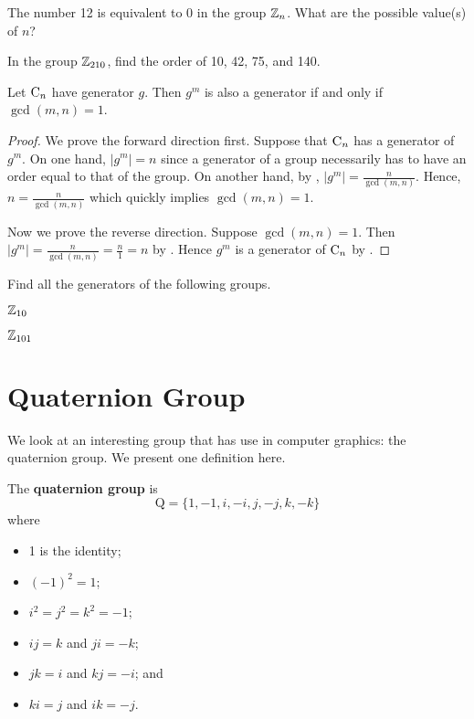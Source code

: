 \begin{exercise}
    The number 12 is equivalent to 0 in the group $\mathbb{Z}_n$. What are the possible value(s) of $n$?
\end{exercise}
\begin{exercise}
    In the group $\mathbb{Z}_{210}$, find the order of 10, 42, 75, and 140.
\end{exercise}

\begin{corollary}\label{corollary-element-in-cyclic-group-is-generator-iff-gcd-is-1}
    Let $\mathrm{C}_{n}$ have generator $g$. Then $g^m$ is also a generator if and only if $\gcd(m, n) = 1$.
\end{corollary}
\begin{proof}
    We prove the forward direction first. Suppose that $\mathrm{C}_{n}$ has a generator of $g^m$. On one hand, $|g^m| = n$ since a generator of a group necessarily has to have an order equal to that of the group. On another hand, by , $|g^m| = \frac{n}{\gcd(m, n)}$. Hence, $n = \frac{n}{\gcd(m, n)}$ which quickly implies $\gcd(m, n) = 1$.

    Now we prove the reverse direction. Suppose $\gcd(m,n) = 1$. Then $|g^m| = \frac{n}{\gcd(m,n)} = \frac{n}{1} = n$ by . Hence $g^m$ is a generator of $\mathrm{C}_{n}$ by .
\end{proof}

\begin{exercise}
    Find all the generators of the following groups.
    \begin{partquestions}{\alph*}
        \item $\mathbb{Z}_{10}$
        \item $\mathbb{Z}_{101}$
    \end{partquestions}
\end{exercise}

\section{Quaternion Group}
We look at an interesting group that has use in computer graphics: the quaternion group. We present one definition here.
\begin{definition}\label{definition-quaternion-group}
    The \textbf{quaternion group} is
    \[
            \mathrm{Q} = \{1, -1, i, -i, j, -j, k, -k\}
    \]
    where
    \begin{multicols}{2}
        \begin{itemize}
            \item 1 is the identity;
            \item $(-1)^2 = 1$;
            \item $i^2 = j^2 = k^2 = -1$;
            \item $ij = k$ and $ji = -k$;
            \item $jk = i$ and $kj = -i$; and
            \item $ki = j$ and $ik = -j$.
        \end{itemize}
    \end{multicols}
\end{definition}

